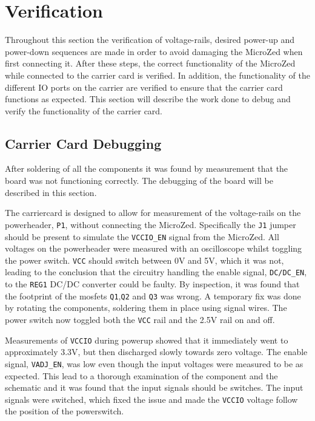 \section{Verification}
Throughout this section the verification of voltage-rails, desired power-up and power-down sequences are made in order to avoid damaging the MicroZed when first connecting it.
After these steps, the correct functionality of the MicroZed while connected to the carrier card is verified. 
In addition, the functionality of the different IO ports on the carrier are verified to ensure that the carrier card functions as expected.
This section will describe the work done to debug and verify the functionality of the carrier card.

\subsection{Carrier Card Debugging}
After soldering of all the components it was found by measurement that the board was not functioning correctly.
The debugging of the board will be described in this section.

The carriercard is designed to allow for measurement of the voltage-rails on the powerheader, \texttt{P1}, without connecting the MicroZed.
Specifically the \texttt{J1} jumper should be present to simulate the \texttt{VCCIO\_EN} signal from the MicroZed.
All voltages on the powerheader were measured with an oscilloscope whilst toggling the power switch.
\texttt{VCC} should switch between 0V and 5V, which it was not, leading to the conclusion that the circuitry handling the enable signal, \texttt{DC/DC\_EN}, to the \texttt{REG1} DC/DC converter could be faulty.
By inspection, it was found that the footprint of the mosfets \texttt{Q1},\texttt{Q2} and \texttt{Q3} was wrong.
A temporary fix was done by rotating the components, soldering them in place using signal wires. 
The power switch now toggled both the \texttt{VCC} rail and the 2.5V rail on and off.

Measurements of \texttt{VCCIO} during powerup showed that it immediately went to approximately 3.3V, but then discharged slowly towards zero voltage.
The enable signal, \texttt{VADJ\_EN}, was low even though the input voltages were measured to be as expected.
This lead to a thorough examination of the component and the schematic and it was found that the input signals should be switches.
The input signals were switched, which fixed the issue and made the \texttt{VCCIO} voltage follow the position of the powerswitch.

